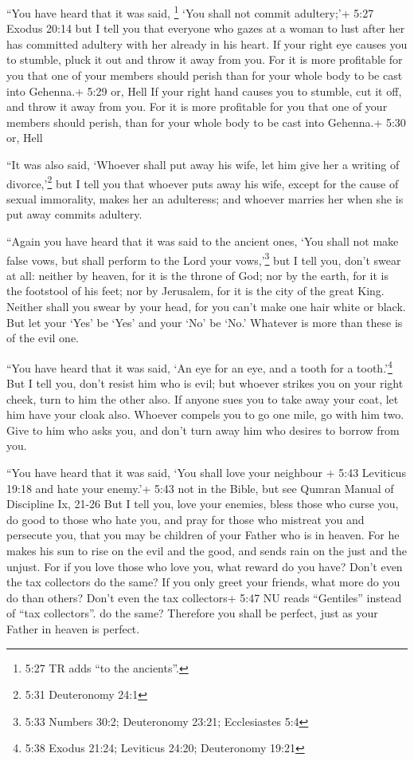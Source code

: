  ``You have heard that it was said, \footnote{5:27 TR adds
  ``to the ancients''.} `You shall not commit adultery;'+ 5:27 Exodus
20:14  but I tell you that everyone who gazes at a woman to
lust after her has committed adultery with her already in his heart.
 If your right eye causes you to stumble, pluck it out and
throw it away from you. For it is more profitable for you that one of
your members should perish than for your whole body to be cast into
Gehenna.+ 5:29 or, Hell  If your right hand causes you to
stumble, cut it off, and throw it away from you. For it is more
profitable for you that one of your members should perish, than for your
whole body to be cast into Gehenna.+ 5:30 or, Hell

 ``It was also said, `Whoever shall put away his wife, let
him give her a writing of divorce,'\footnote{5:31 Deuteronomy 24:1}
 but I tell you that whoever puts away his wife, except for
the cause of sexual immorality, makes her an adulteress; and whoever
marries her when she is put away commits adultery.

 ``Again you have heard that it was said to the ancient
ones, `You shall not make false vows, but shall perform to the Lord your
vows,'\footnote{5:33 Numbers 30:2; Deuteronomy 23:21; Ecclesiastes 5:4}
 but I tell you, don't swear at all: neither by heaven, for
it is the throne of God;  nor by the earth, for it is the
footstool of his feet; nor by Jerusalem, for it is the city of the great
King.  Neither shall you swear by your head, for you can't
make one hair white or black.  But let your `Yes' be `Yes'
and your `No' be `No.' Whatever is more than these is of the evil one.

 ``You have heard that it was said, `An eye for an eye, and
a tooth for a tooth.'\footnote{5:38 Exodus 21:24; Leviticus 24:20;
  Deuteronomy 19:21}  But I tell you, don't resist him who
is evil; but whoever strikes you on your right cheek, turn to him the
other also.  If anyone sues you to take away your coat, let
him have your cloak also.  Whoever compels you to go one
mile, go with him two.  Give to him who asks you, and don't
turn away him who desires to borrow from you.

 ``You have heard that it was said, `You shall love your
neighbour + 5:43 Leviticus 19:18 and hate your enemy.'+ 5:43 not in the
Bible, but see Qumran Manual of Discipline Ix, 21-26  But I
tell you, love your enemies, bless those who curse you, do good to those
who hate you, and pray for those who mistreat you and persecute you,
 that you may be children of your Father who is in heaven.
For he makes his sun to rise on the evil and the good, and sends rain on
the just and the unjust.  For if you love those who love
you, what reward do you have? Don't even the tax collectors do the same?
 If you only greet your friends, what more do you do than
others? Don't even the tax collectors+ 5:47 NU reads ``Gentiles''
instead of ``tax collectors''. do the same?  Therefore you
shall be perfect, just as your Father in heaven is perfect.

